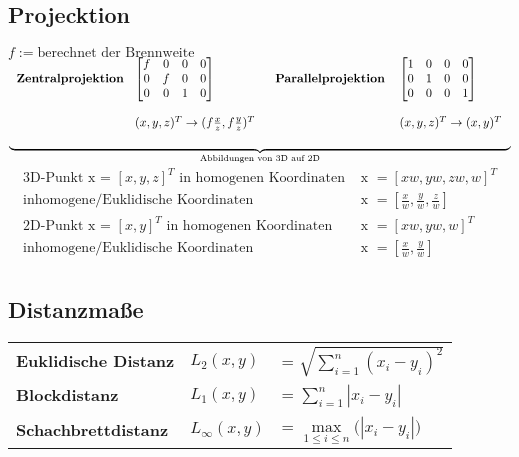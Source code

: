 \documentclass[8pt]{article}
\begin{document}
			\subsection{Projecktion}
				$f := \text{berechnet der Brennweite}$\\
				$\underbrace{\begin{tabular}{p{3cm} p{3.5cm} p{3.3cm} p{3cm}}
					\textbf{Zentralprojektion } & $
						\begin{bmatrix}
							f & 0 & 0 & 0 \\
							0 & f & 0 & 0 \\
							0 & 0 & 1 & 0 \\
						\end{bmatrix}$ & 
					\textbf{ Parallelprojektion } & {$
						\begin{bmatrix}
							1 & 0 & 0 & 0 \\
							0 & 1 & 0 & 0 \\
							0 & 0 & 0 & 1 \\
						\end{bmatrix}
					$}\\\\
					& $(x, y, z)^T \rightarrow (f \frac{x}{z}, f \frac{y}{z})^T$ & & $(x, y, z)^T \rightarrow (x, y)^T$\\\\
				\end{tabular}}_{\text{Abbildungen von 3D auf 2D}}$\\
				\begin{align*}
					\text{3D-Punkt x = } [x, y, z]^T \text{ in homogenen Koordinaten } & \text{x } = [xw, yw, zw, w]^T\\
					\text{inhomogene/Euklidische Koordinaten } & \text{x } = [\frac{x}{w}, \frac{y}{w}, \frac{z}{w}]\\
					\text{2D-Punkt x = } [x, y]^T \text{ in homogenen Koordinaten } & \text{x } = [xw, yw, w]^T\\
					\text{inhomogene/Euklidische Koordinaten } & \text{x } = [\frac{x}{w}, \frac{y}{w}]\\
				\end{align*}
			\subsection{Distanzma\ss e}
				\begin{tabular}{p{3.5cm} p{1.5cm} p{3cm}}
					\textbf{Euklidische Distanz } 	& $L_2(x, y)$ 		& = $\sqrt{\sum\limits_{i = 1}^{n} (x_i - y_i)^2}$\\
					\textbf{Blockdistanz } 			& $L_1(x, y)$ 		& = $\sum\limits_{i = 1}^{n} |x_i - y_i|$ \\
					\textbf{Schachbrettdistanz } 	& $L_\infty(x, y)$ 	& = $\max\limits^{}_{1 \leq i \leq n} \big( |x_i - y_i|\big)$ \\
				\end{tabular}
\end{document}
